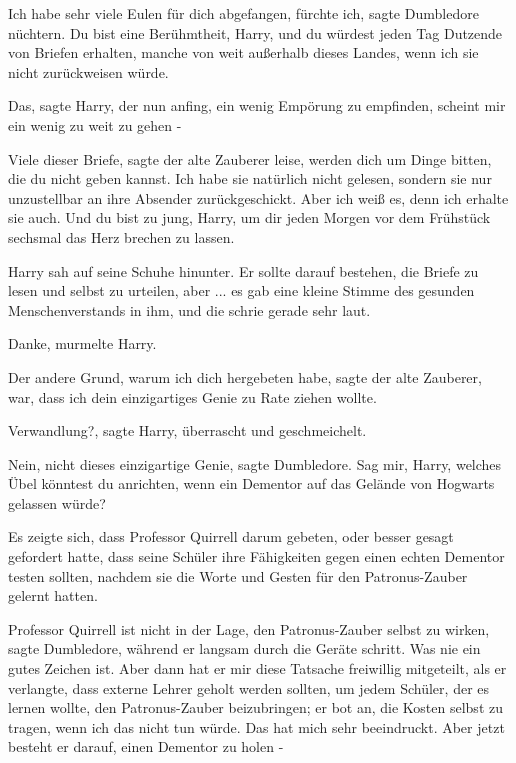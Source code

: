 \glqq Ich habe sehr viele Eulen für dich abgefangen, fürchte ich\grqq{}, sagte
Dumbledore nüchtern. \glqq Du bist eine Berühmtheit, Harry, und du würdest jeden
Tag Dutzende von Briefen erhalten, manche von weit außerhalb dieses Landes, wenn
ich sie nicht zurückweisen würde.\grqq{}

\glqq Das\grqq{}, sagte Harry, der nun anfing, ein wenig Empörung zu empfinden,
\glqq scheint mir ein wenig zu weit zu gehen -\grqq{}

\glqq Viele dieser Briefe\grqq{}, sagte der alte Zauberer leise, \glqq werden
dich um Dinge bitten, die du nicht geben kannst. Ich habe sie natürlich nicht
gelesen, sondern sie nur unzustellbar an ihre Absender zurückgeschickt. Aber ich
weiß es, denn ich erhalte sie auch. Und du bist zu jung, Harry, um dir jeden
Morgen vor dem Frühstück sechsmal das Herz brechen zu lassen.\grqq{}

Harry sah auf seine Schuhe hinunter. Er sollte darauf bestehen, die Briefe zu
lesen und selbst zu urteilen, aber ... es gab eine kleine Stimme des gesunden
Menschenverstands in ihm, und die schrie gerade sehr laut.

\glqq Danke\grqq{}, murmelte Harry.

\glqq Der andere Grund, warum ich dich hergebeten habe\grqq{}, sagte der alte
Zauberer, \glqq war, dass ich dein einzigartiges Genie zu Rate ziehen
wollte.\grqq{}

\glqq Verwandlung?\grqq{}, sagte Harry, überrascht und geschmeichelt.

\glqq Nein, nicht dieses einzigartige Genie\grqq{}, sagte Dumbledore. \glqq Sag
mir, Harry, welches Übel könntest du anrichten, wenn ein Dementor auf das
Gelände von Hogwarts gelassen würde?\grqq{}

Es zeigte sich, dass Professor Quirrell darum gebeten, oder besser gesagt
gefordert hatte, dass seine Schüler ihre Fähigkeiten gegen einen echten Dementor
testen sollten, nachdem sie die Worte und Gesten für den Patronus-Zauber gelernt
hatten.

\glqq Professor Quirrell ist nicht in der Lage, den Patronus-Zauber selbst zu
wirken\grqq{}, sagte Dumbledore, während er langsam durch die Geräte schritt.
\glqq Was nie ein gutes Zeichen ist. Aber dann hat er mir diese Tatsache
freiwillig mitgeteilt, als er verlangte, dass externe Lehrer geholt werden
sollten, um jedem Schüler, der es lernen wollte, den Patronus-Zauber
beizubringen; er bot an, die Kosten selbst zu tragen, wenn ich das nicht tun
würde. Das hat mich sehr beeindruckt. Aber jetzt besteht er darauf, einen
Dementor zu holen -\grqq{}

